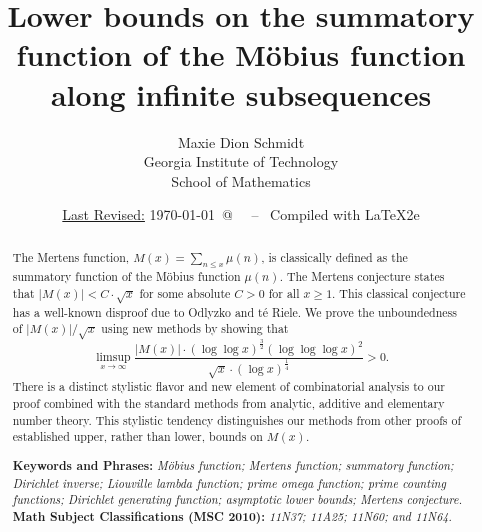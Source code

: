 \documentclass[11pt,reqno,a4letter]{article}
\title{
       \LARGE{
       Lower bounds on the summatory function of the M\"obius function along infinite subsequences 
       } 
}
\author{{\Large Maxie Dion Schmidt} \\ 
        {\normalsize Georgia Institute of Technology} \\[0.025cm] 
        {\normalsize School of Mathematics} 
}
\date{\small\underline{Last Revised:} \today \ @\ \hhmmsstime{} \ -- \ Compiled with \LaTeX2e}
\numberwithin{figure}{section}
\numberwithin{table}{section}
\theoremstyle{plain}
\numberwithin{theorem}{section}
\theoremstyle{definition}
\begin{document}
 

\maketitle

\begin{abstract} 
The Mertens function, $M(x) = \sum_{n \leq x} \mu(n)$, is classically 
defined as the summatory function of the M\"obius function $\mu(n)$. 
The Mertens conjecture states that $|M(x)| < C \cdot \sqrt{x}$ for some absolute $C > 0$ for all 
$x \geq 1$. 
This classical conjecture has a well-known disproof due to 
Odlyzko and t\'{e} Riele. 
We prove the unboundedness of $|M(x)| / \sqrt{x}$ using new methods by showing that 
$$\limsup_{x \rightarrow \infty} \frac{|M(x)| \cdot (\log\log x)^{\frac{3}{2}} (\log\log\log x)^{2}}{ 
  \sqrt{x} \cdot (\log x)^{\frac{1}{4}}} > 0.$$ 
There is a distinct stylistic 
flavor and new element of combinatorial analysis to our proof 
combined with the standard methods from analytic, additive and elementary number theory. 
This stylistic tendency distinguishes 
our methods from other proofs of established upper, rather than lower, bounds on $M(x)$. 

\bigskip 
\noindent
\textbf{Keywords and Phrases:} {\it M\"obius function; Mertens function; summatory function; 
                                    Dirichlet inverse; Liouville lambda function; prime omega function; 
                                    prime counting functions; Dirichlet generating function; 
                                    asymptotic lower bounds; Mertens conjecture. } \\ 
\textbf{Math Subject Classifications (MSC 2010):} {\it 11N37; 11A25; 11N60; and 11N64. } 
\end{abstract} 


\newpage
\label{Appendix_Glossary_NotationConvs}
     \vskip 0in
     \printglossary[type={symbols},
                    title={Glossary of special notation and conventions},
                    style={glossstyleSymbol},
                    nogroupskip=true]
\end{document}
